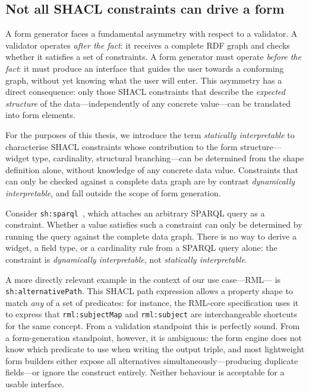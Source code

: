 \subsection{Not all SHACL constraints can drive a form}
\label{sec:static-interp}

A form generator faces a fundamental asymmetry with respect to a validator. A validator operates \emph{after the fact}: it receives a complete RDF graph and checks whether it satisfies a set of constraints.
A form generator must operate \emph{before the fact}: it must produce an interface that guides the user towards a conforming graph, without yet knowing what the user will enter.
This asymmetry has a direct consequence: only those SHACL constraints that describe the \emph{expected structure} of the data---independently of any concrete value---can be translated into form elements.

For the purposes of this thesis, we introduce the term \emph{statically interpretable} to characterise SHACL constraints whose contribution to the form structure---widget type, cardinality, structural branching---can be determined from the shape definition alone, without knowledge of any concrete data value.
Constraints that can only be checked against a complete data graph are by contrast \emph{dynamically interpretable}, and fall outside the scope of form generation.

Consider \texttt{sh:sparql}~\cite{w3c-shacl}, which attaches an arbitrary SPARQL query as a constraint. Whether a value satisfies such a constraint can only be determined by running the query against the complete data graph. 
There is no way to derive a widget, a field type, or a cardinality rule from a SPARQL query alone: the constraint is \emph{dynamically interpretable}, not \emph{statically interpretable}.

A more directly relevant example in the context of our use case---RML--- is \texttt{sh:alternativePath}.
This SHACL path expression allows a property shape to match \emph{any} of a set of predicates: for instance, the RML-core specification uses it to express that \texttt{rml:subjectMap} and \texttt{rml:subject} are interchangeable shortcuts for the same concept.
From a validation standpoint this is perfectly sound.
From a form-generation standpoint, however, it is ambiguous: the form engine does not know which predicate to use when writing the output triple, and most lightweight form builders either expose all alternatives simultaneously---producing duplicate fields---or ignore the construct entirely.
Neither behaviour is acceptable for a usable interface.

